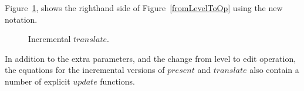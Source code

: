 \begin{small}
\end{small}

Figure~\ref{incrementalTranslate}, shows the righthand side of Figure~\ref{fromLevelToOp} using the new notation.

\begin{figure}
\begin{small}
\begin{center}
\begin{center}
\begin{small}
\bigskip \noindent
{}
\end{small}
\end{center}\caption{Incremental $translate$.}\label{incrementalTranslate} 
\end{center}
\end{small}
\end{figure}

In addition to the extra parameters, and the change from level to edit operation, the equations for the incremental versions of $present$ and $translate$ also contain a number of explicit $update$ functions. 
 
